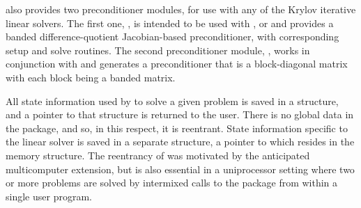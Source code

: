 {\cvode} also provides two preconditioner modules, for use with any of
the Krylov iterative linear solvers. The first one, {\cvbandpre},
is intended to be used with {\nvecs}, {\nvecopenmp} or {\nvecpthreads}
and provides a banded difference-quotient Jacobian-based
preconditioner, with corresponding setup and solve routines.
The second preconditioner module, {\cvbbdpre}, works in conjunction
with {\nvecp} and generates a preconditioner that is a block-diagonal
matrix with each block being a banded matrix.

All state information used by {\cvode} to solve a given problem is saved
in a structure, and a pointer to that structure is returned to the
user.  There is no global data in the {\cvode} package, and so, in this
respect, it is reentrant. State information specific to the linear
solver is saved in a separate structure, a pointer to which resides in
the {\cvode} memory structure. The reentrancy of {\cvode} was motivated
by the anticipated multicomputer extension, but is also essential
in a uniprocessor setting where two or more problems are solved by
intermixed calls to the package from within a single user program.
